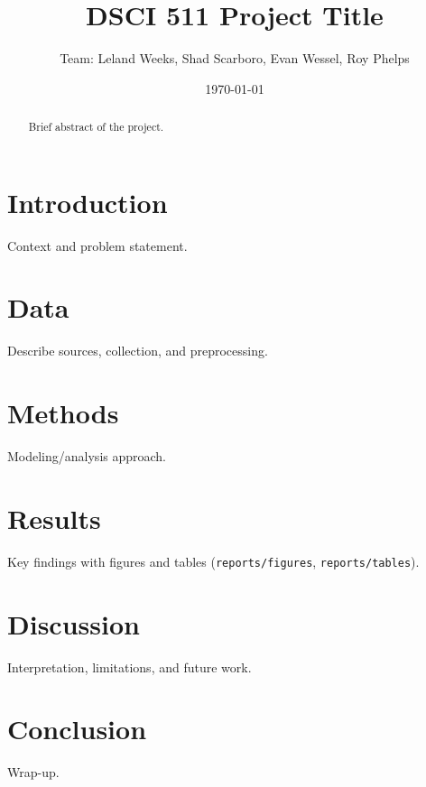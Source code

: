 \documentclass[11pt]{article}
\title{DSCI 511 Project Title}
\author{Team: Leland Weeks, Shad Scarboro, Evan Wessel, Roy Phelps}
\date{\today}
\begin{document}
\maketitle

\begin{abstract}
Brief abstract of the project.
\end{abstract}

\section{Introduction}
Context and problem statement.

\section{Data}
Describe sources, collection, and preprocessing.

\section{Methods}
Modeling/analysis approach.

\section{Results}
Key findings with figures and tables (\texttt{reports/figures}, \texttt{reports/tables}).

\section{Discussion}
Interpretation, limitations, and future work.

\section{Conclusion}
Wrap-up.



\end{document}
